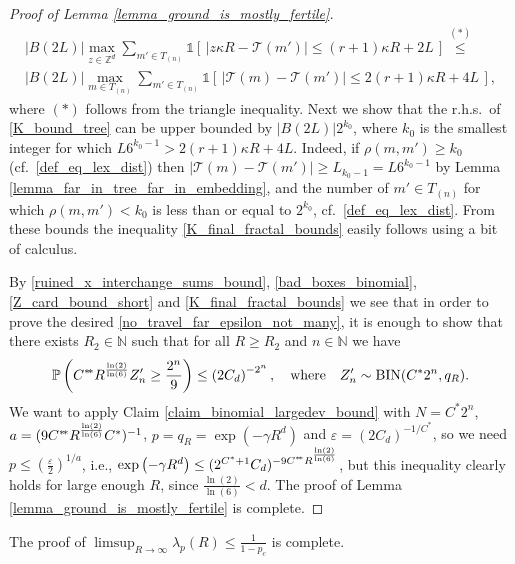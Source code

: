 \documentclass[a4paper,12pt]{article}
\newcommand{\sstar}{* \hspace{-.05cm} *}
\begin{document}
\begin{proof}[Proof of Lemma \ref{lemma_ground_is_mostly_fertile}]
\begin{multline}
 |B(2L)| \max_{z \in \mathbb{Z}^d } \sum_{ m' \in T_{(n)} } \mathds{1}\left[ \, | z\kappa R- \mathcal{T}(m')  |\leq (r+1)\kappa R +2L   \, \right]
 \stackrel{(*)}{\leq}
 \\
 |B(2L)| \max_{m \in T_{(n)} } \sum_{ m' \in T_{(n)} } \mathds{1}\left[ \, | \mathcal{T}(m)-\mathcal{T}(m')  |\leq 2(r+1)\kappa R +4L   \, \right],
\end{multline}
where $(*)$ follows from the triangle inequality.
Next we show that the r.h.s.\ of \eqref{K_bound_tree} can be upper bounded by $|B(2L)| 2^{k_0}$, where $k_0$ is the smallest integer for which
 $L 6^{k_0-1} > 2(r+1)\kappa R +4L$. Indeed, if $\rho(m, m') \geq k_0$ (cf.\ \eqref{def_eq_lex_dist}) then
 $| \mathcal{T}(m)-\mathcal{T}(m') | \geq L_{k_0-1}=L 6^{k_0-1}$ by Lemma \ref{lemma_far_in_tree_far_in_embedding}, and
 the number of $m' \in T_{(n)}$ for which $\rho(m, m') < k_0$ is less than or equal to $2^{k_0}$, cf.\ \eqref{def_eq_lex_dist}.
   From these bounds the inequality  \eqref{K_final_fractal_bounds} easily follows using a bit of calculus.

 By \eqref{ruined_x_interchange_sums_bound}, \eqref{bad_boxes_binomial}, \eqref{Z_card_bound_short} and
\eqref{K_final_fractal_bounds} we see that in order to prove the desired \eqref{no_travel_far_epsilon_not_many}, it is enough to show that there exists  $R_2 \in \mathbb{N}$ such that  for all $R \geq R_2$ and $n \in \mathbb{N}$
we have \begin{equation}
\mathbb{P}\left( C^{\sstar} R^{\frac{\ln(2)}{\ln(6)}}  Z_n' \geq \frac{2^n}{9}    \right) \leq \left( 2 C_d  \right)^{-2^n}, \quad \text{where} \quad Z_n' \sim \mathrm{BIN}(C^* 2^n, q_R).
\end{equation}
We want to apply Claim \ref{claim_binomial_largedev_bound} with $N=C^* 2^n$, $a=(9 C^{\sstar}  R^{\frac{\ln(2)}{\ln(6)}} C^* )^{-1}$, $p=q_R=\exp\left(-\gamma R^d \right)$ and $\varepsilon=(2 C_d)^{-{1/C^*}}$, so we need $p \leq \left( \frac{\varepsilon}{2} \right)^{1/a}$, i.e., $\exp\left(-\gamma R^d \right) \leq
(2^{C^*+1} C_d)^{-9C^{\sstar} R^{\frac{\ln(2)}{\ln(6)}}}$, but this inequality clearly holds for large enough $R$, since $\frac{\ln(2)}{\ln(6)} <d$.
The proof of Lemma \ref{lemma_ground_is_mostly_fertile} is complete.
\end{proof}

The proof of $\limsup_{R \to \infty } \lambda_p(R) \leq \frac{1}{1-p_c}$ is complete.
\end{document}
